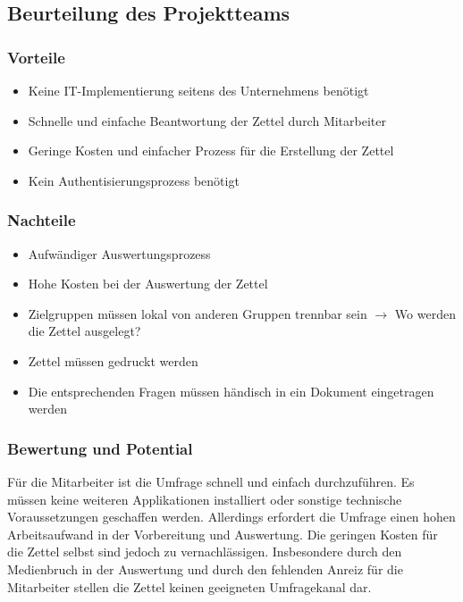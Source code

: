\subsection{Beurteilung des Projektteams}
\subsubsection{Vorteile}

\begin{itemize}
\item Keine IT-Implementierung seitens des Unternehmens benötigt
\item Schnelle und einfache Beantwortung der Zettel durch Mitarbeiter
\item Geringe Kosten und einfacher Prozess für die Erstellung der Zettel
\item Kein Authentisierungsprozess benötigt
\end{itemize}

\subsubsection{Nachteile}

\begin{itemize}
\item Aufwändiger Auswertungsprozess
\item Hohe Kosten bei der Auswertung der Zettel
\item Zielgruppen müssen lokal von anderen Gruppen trennbar sein $\rightarrow$ Wo werden die Zettel ausgelegt?
\item Zettel müssen gedruckt werden
\item Die entsprechenden Fragen müssen händisch in ein Dokument eingetragen werden
\end{itemize}

\subsubsection{Bewertung und Potential}
Für die Mitarbeiter ist die Umfrage schnell und einfach durchzuführen. Es müssen keine weiteren Applikationen installiert oder sonstige technische Voraussetzungen geschaffen werden. Allerdings erfordert die Umfrage einen hohen Arbeitsaufwand in der Vorbereitung und Auswertung. Die geringen Kosten für die Zettel selbst sind jedoch zu vernachlässigen. Insbesondere durch den Medienbruch in der Auswertung und durch den fehlenden Anreiz für die Mitarbeiter stellen die Zettel keinen geeigneten Umfragekanal dar.

